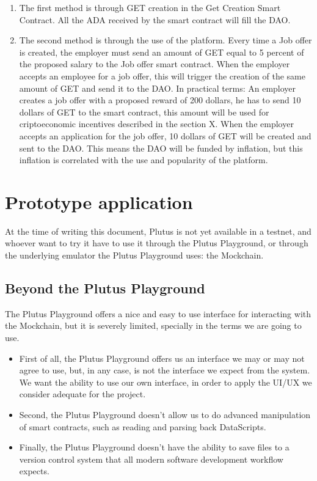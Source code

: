 \documentclass{article}
\begin{document}
\begin{enumerate}
  \item The first method is through GET creation in the Get Creation Smart Contract. All the ADA received by the smart contract will fill the DAO.
  \item The second method is through the use of the platform. Every time a Job offer is created, the employer must send an amount of GET equal to 5 percent of the proposed salary to the Job offer smart contract. When the employer accepts an employee for a job offer, this will trigger the creation of the same amount of GET and send it to the DAO. In practical terms: 
  An employer creates a job offer with a proposed reward of 200 dollars, he has to send 10 dollars of GET to the smart contract, this amount will be used for criptoeconomic incentives described in the section X. When the employer accepts an application for the job offer, 10 dollars of GET will be created and sent to the DAO. This means the DAO will be funded by inflation, but this inflation is correlated with the use and popularity of the platform. 
\end{enumerate}

\section{Prototype application}
At the time of writing this document, Plutus is not yet available in a testnet, and whoever want to try it have to use it through the Plutus Playground, or through the underlying emulator the Plutus Playground uses: the Mockchain.

\subsection{Beyond the Plutus Playground}
The Plutus Playground offers a nice and easy to use interface for interacting with the Mockchain, but it is severely limited, specially in the terms we are going to use.

\begin{itemize}
  \item First of all, the Plutus Playground offers us an interface we may or may not agree to use, but, in any case, is not the interface we expect from the system. We want the ability to use our own interface, in order to apply the UI/UX we consider adequate for the project.
  \item Second, the Plutus Playground doesn't allow us to do advanced manipulation of smart contracts, such as reading and parsing back DataScripts.
  \item Finally, the Plutus Playground doesn't have the ability to save files to a version control system that all modern software development workflow expects.
\end{itemize}
\end{document}

